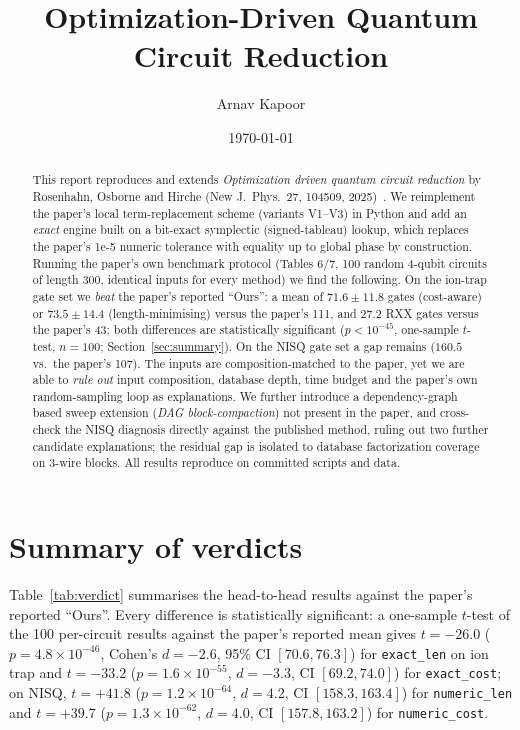 \documentclass[11pt,a4paper]{article}
\title{Optimization-Driven Quantum Circuit Reduction\\[4pt]}
\author{Arnav Kapoor}
\date{\today}
\begin{document}
\maketitle

\begin{abstract}
This report reproduces and extends \emph{Optimization driven quantum circuit
reduction} by Rosenhahn, Osborne and Hirche (New J.\ Phys.\ 27, 104509,
2025)~\cite{Rosenhahn2025Optimization}. We reimplement the paper's local
term-replacement scheme (variants V1--V3) in Python and add an
\emph{exact} engine built on a bit-exact symplectic (signed-tableau) lookup,
which replaces the paper's 1e-5 numeric tolerance with equality up to global
phase by construction. Running the paper's own benchmark protocol (Tables 6/7,
100 random 4-qubit circuits of length 300, identical inputs for every method)
we find the following. On the ion-trap gate set we \emph{beat} the paper's
reported ``Ours'': a mean of $71.6\pm 11.8$ gates (cost-aware) or
$73.5\pm 14.4$ (length-minimising) versus the paper's 111, and $27.2$ RXX gates
versus the paper's 43; both differences are statistically significant
($p<10^{-45}$, one-sample $t$-test, $n=100$; Section~\ref{sec:summary}).
On the NISQ gate set a gap remains ($160.5$ vs.\ the paper's 107). The inputs
are composition-matched to the paper, yet we are able to \emph{rule out} input
composition, database depth, time budget and the paper's own random-sampling
loop as explanations. We further introduce a dependency-graph based sweep
extension (\emph{DAG block-compaction}) not present in the paper, and
cross-check the NISQ diagnosis directly against the published method,
ruling out two further candidate explanations; the residual gap is isolated
to database factorization coverage on 3-wire blocks. All results reproduce
on committed scripts and data.
\end{abstract}

\section{Summary of verdicts}
\label{sec:summary}
Table~\ref{tab:verdict} summarises the head-to-head results against the
paper's reported ``Ours''. Every difference is statistically significant: a
one-sample $t$-test of the 100 per-circuit results against the paper's reported
mean gives $t=-26.0$ ($p=4.8\times10^{-46}$, Cohen's $d=-2.6$, 95\% CI
$[70.6,76.3]$) for \texttt{exact\_len} on ion trap and $t=-33.2$
($p=1.6\times10^{-55}$, $d=-3.3$, CI $[69.2,74.0]$) for \texttt{exact\_cost};
on NISQ, $t=+41.8$ ($p=1.2\times10^{-64}$, $d=4.2$, CI $[158.3,163.4]$) for
\texttt{numeric\_len} and $t=+39.7$ ($p=1.3\times10^{-62}$, $d=4.0$, CI
$[157.8,163.2]$) for \texttt{numeric\_cost}.
\end{document}
